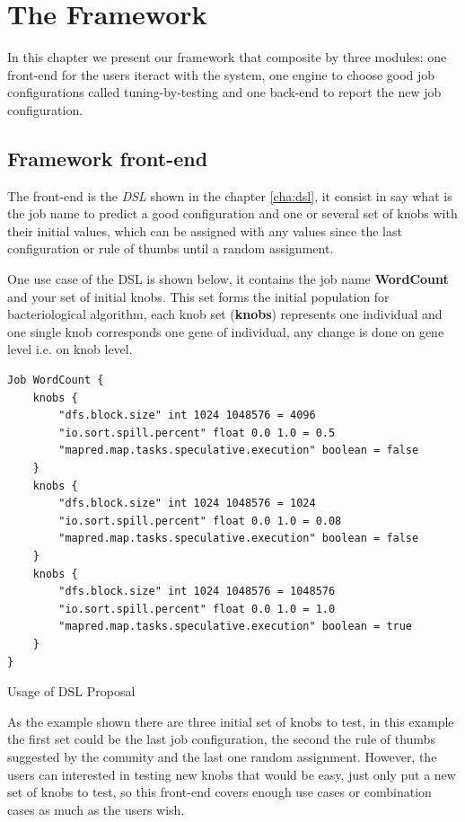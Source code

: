 \chapter{The Framework} %
\label{cha:framework}

In this chapter we present our framework that composite by three modules: one front-end
for the users iteract with the system, one engine to choose good job configurations
called tuning-by-testing and one back-end to report the new job configuration.

\section{Framework front-end}

The front-end is the {\it DSL} shown in the chapter \ref{cha:dsl}, it consist in
say what is the job name to predict a good configuration and one or several set of
knobs with their initial values, which can be assigned with any values since the
last configuration or rule of thumbs until a random assignment.

One use case of the DSL is shown below, it contains the job name \textbf{WordCount}
and your set of initial knobs. This set forms the initial population for bacteriological
algorithm, each knob set ({\bf knobs}) represents one individual and one single
knob corresponds one gene of individual, any change is done on gene level i.e.
on knob level.

\singlespacing
\begin{listing}[H]
\begin{verbatim}
Job WordCount {
	knobs {
		"dfs.block.size" int 1024 1048576 = 4096
		"io.sort.spill.percent" float 0.0 1.0 = 0.5 
		"mapred.map.tasks.speculative.execution" boolean = false
	}
	knobs {
		"dfs.block.size" int 1024 1048576 = 1024
		"io.sort.spill.percent" float 0.0 1.0 = 0.08
		"mapred.map.tasks.speculative.execution" boolean = false
	}
	knobs {
		"dfs.block.size" int 1024 1048576 = 1048576
		"io.sort.spill.percent" float 0.0 1.0 = 1.0
		"mapred.map.tasks.speculative.execution" boolean = true
	}
}
\end{verbatim}
\caption{Usage of DSL Proposal} 
\label{listing:usageDSL}
\end{listing}

As the example shown there are three initial set of knobs to test, in this example
the first set could be the last job configuration, the second the rule of thumbs
suggested by the comunity and the last one random assignment. However, the users
can interested in testing new knobs that would be easy, just only put a new set
of knobs to test, so this front-end covers enough use cases or combination cases
as much as the users wish.
\newline
\newline
